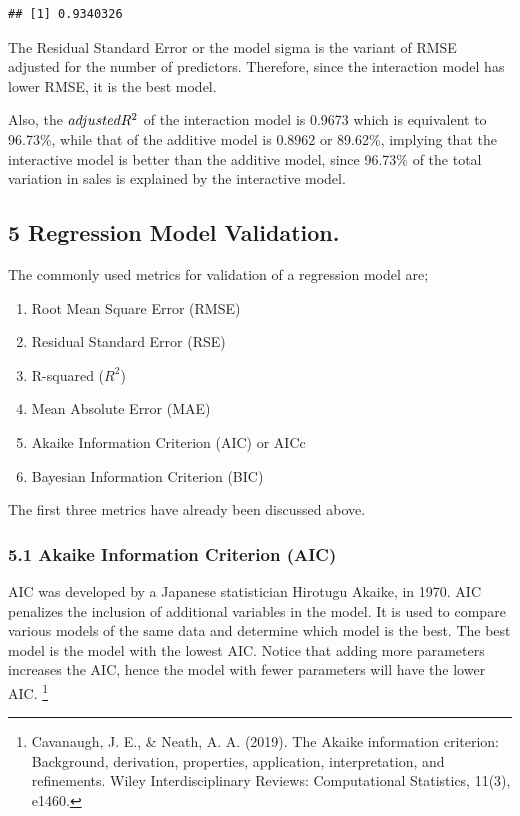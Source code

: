 \documentclass[
]{article}
\begin{document}
\begin{lstlisting}
## [1] 0.9340326
\end{lstlisting}

The Residual Standard Error or the model sigma is the variant of RMSE
adjusted for the number of predictors. Therefore, since the interaction
model has lower RMSE, it is the best model.

Also, the \(adjusted\space R^2\) of the interaction model is 0.9673
which is equivalent to 96.73\%, while that of the additive model is
0.8962 or 89.62\%, implying that the interactive model is better than
the additive model, since 96.73\% of the total variation in sales is
explained by the interactive model.

\hypertarget{regression-model-validation.}{%
\subsection{5 Regression Model
Validation.}\label{regression-model-validation.}}

The commonly used metrics for validation of a regression model are;

\begin{enumerate}
\def\labelenumi{\arabic{enumi}.}
\item
  Root Mean Square Error (RMSE)
\item
  Residual Standard Error (RSE)
\item
  R-squared (\(R^2\))
\item
  Mean Absolute Error (MAE)
\item
  Akaike Information Criterion (AIC) or AICc
\item
  Bayesian Information Criterion (BIC)
\end{enumerate}

The first three metrics have already been discussed above.

\hypertarget{akaike-information-criterion-aic}{%
\subsubsection{5.1 Akaike Information Criterion
(AIC)}\label{akaike-information-criterion-aic}}

AIC was developed by a Japanese statistician Hirotugu Akaike, in 1970.
AIC penalizes the inclusion of additional variables in the model. It is
used to compare various models of the same data and determine which
model is the best. The best model is the model with the lowest AIC.
Notice that adding more parameters increases the AIC, hence the model
with fewer parameters will have the lower AIC. \footnote{Cavanaugh, J.
  E., \& Neath, A. A. (2019). The Akaike information criterion:
  Background, derivation, properties, application, interpretation, and
  refinements. Wiley Interdisciplinary Reviews: Computational
  Statistics, 11(3), e1460.}
\end{document}
